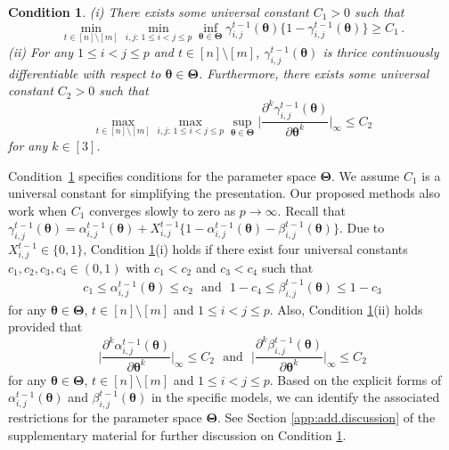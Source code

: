 \documentclass[12pt]{article}
\newtheorem{condition}{Condition}
\newtheorem{remark}{Remark}
\newcommand{\bTheta}{\boldsymbol \Theta}
\newcommand{\btheta}{\boldsymbol \theta}
\newcommand{\0}{{\bf 0}}
\begin{document}
\begin{condition}\label{as:gambd}
{\rm(i)} There exists some universal constant $C_{1}>0$ such that
\[
\min_{t\in[n]\setminus[m]}\min_{i,j:\,1\leq i<j\leq p}\inf_{\btheta\in\bTheta}\gamma_{i,j}^{t-1}(\btheta)\{1-\gamma_{i,j}^{t-1}(\btheta)\}\geq C_1\,.
\]
{\rm (ii)} For any $1\leq i<j\leq p$ and $t\in[n]\setminus[m]$, $\gamma_{i,j}^{t-1}(\btheta)$ is thrice continuously
differentiable with respect to $\btheta\in\bTheta$. Furthermore, there exists some universal constant
$C_{2}>0$ such that
\[
\max_{t\in[n]\setminus[m]}\max_{i,j:\,1\leq i<j\leq p}\sup_{\btheta\in\bTheta}\bigg|\frac{\partial^k \gamma_{i,j}^{t-1}(\btheta)}{\partial\btheta^k}\bigg|_\infty\leq C_2
\]
for any $k\in[3]$.
\end{condition}

Condition~{\rm\ref{as:gambd}} specifies conditions for  the parameter space
$\bTheta$. We assume $C_1$ is a universal constant for simplifying the presentation. Our proposed methods also work when $C_1$ converges slowly to zero as $p\rightarrow\infty$.  Recall that $
\gamma_{i,j}^{t-1}(\btheta) =\alpha_{i,j}^{t-1}(\btheta) +X_{i,j}^{t-1} \{1 - \alpha_{i,j}^{t-1}(\btheta) -\beta_{i,j}^{t-1}(\btheta)\}
$. Due to $X_{i,j}^{t-1}\in\{0,1\}$, Condition {\rm\ref{as:gambd}(i)} holds if there exist four universal constants $c_1,c_2,c_3,c_4\in(0,1)$ with $c_1<c_2$ and $c_3<c_4$ such that
\begin{align*}
c_1\leq\alpha_{i,j}^{t-1}(\btheta)\leq c_2~~~\textrm{and}~~~1-c_4\leq \beta_{i,j}^{t-1}(\btheta)\leq 1-c_3
\end{align*}
for any $\btheta\in\bTheta$, $t\in[n]\setminus[m]$ and $1\leq i<j\leq p$. Also, Condition {\rm\ref{as:gambd}(ii)} holds provided that
\[
\bigg|\frac{\partial^k \alpha_{i,j}^{t-1}(\btheta)}{\partial\btheta^k}\bigg|_\infty\leq C_2~~~\textrm{and}~~~\bigg|\frac{\partial^k \beta_{i,j}^{t-1}(\btheta)}{\partial\btheta^k}\bigg|_\infty\leq C_2
\]
for any $\btheta\in\bTheta$, $t\in[n]\setminus[m]$ and $1\leq i<j\leq p$. Based on the explicit forms of $\alpha_{i,j}^{t-1}(\btheta)$ and $\beta_{i,j}^{t-1}(\btheta)$ in the specific models, we can identify the associated restrictions for the parameter space $\bTheta$. See
 Section \ref{app:add.discussion} of the supplementary material for further discussion on Condition {\rm\ref{as:gambd}}.

\end{document}
